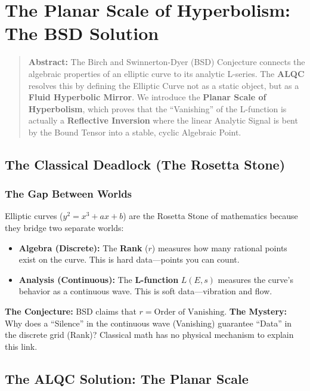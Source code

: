 \documentclass[11pt, letterpaper]{article}
\begin{document}
\section{The Planar Scale of Hyperbolism: The BSD Solution}\label{appendixA.2}
\label{sec:bsd_solution}

\begin{quote}
    \textbf{Abstract:} The Birch and Swinnerton-Dyer (BSD) Conjecture connects the algebraic properties of an elliptic curve to its analytic L-series. The \textbf{ALQC} resolves this by defining the Elliptic Curve not as a static object, but as a \textbf{Fluid Hyperbolic Mirror}. We introduce the \textbf{Planar Scale of Hyperbolism}, which proves that the ``Vanishing'' of the L-function is actually a \textbf{Reflective Inversion} where the linear Analytic Signal is bent by the Bound Tensor into a stable, cyclic Algebraic Point.
\end{quote}

\subsection{The Classical Deadlock (The Rosetta Stone)}\label{appendixA.2.1}

\subsubsection{The Gap Between Worlds}
Elliptic curves ($y^2 = x^3 + ax + b$) are the Rosetta Stone of mathematics because they bridge two separate worlds:
\begin{itemize}
    \item \textbf{Algebra (Discrete):} The \textbf{Rank} ($r$) measures how many rational points exist on the curve. This is hard data—points you can count.
    \item \textbf{Analysis (Continuous):} The \textbf{L-function} $L(E, s)$ measures the curve's behavior as a continuous wave. This is soft data—vibration and flow.
\end{itemize}
\textbf{The Conjecture:} BSD claims that $r = \text{Order of Vanishing}$.
\textbf{The Mystery:} Why does a ``Silence'' in the continuous wave (Vanishing) guarantee ``Data'' in the discrete grid (Rank)? Classical math has no physical mechanism to explain this link.

\subsection{The ALQC Solution: The Planar Scale}\label{appendixA.2.2}
\end{document}
